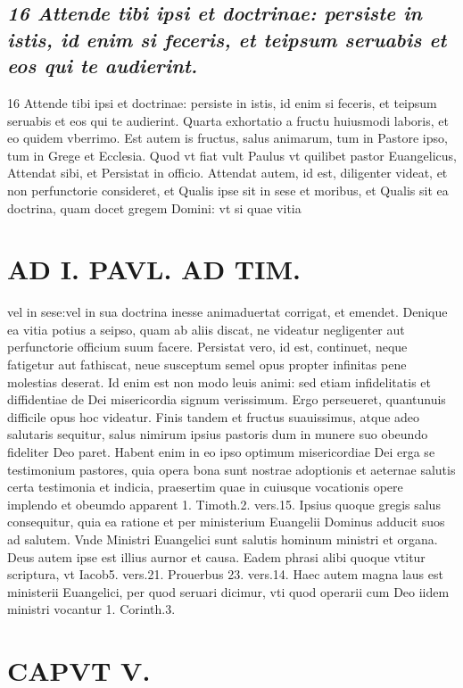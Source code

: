 \documentclass{article}
\begin{document}
\begin{pages}
\subsection*{\textit{16 Attende tibi ipsi et doctrinae: persiste in istis, id enim si feceris, et teipsum seruabis et eos qui te audierint.}}16 Attende tibi ipsi et doctrinae: persiste in istis, id enim si feceris, et teipsum seruabis et eos qui te audierint. Quarta exhortatio a fructu huiusmodi laboris, et eo quidem vberrimo. Est autem is fructus, salus animarum, tum in Pastore ipso, tum in Grege et Ecclesia. Quod vt fiat vult Paulus vt quilibet pastor Euangelicus, Attendat sibi, et Persistat in officio. Attendat autem, id est, diligenter videat, et non perfunctorie consideret, et Qualis ipse sit in sese et moribus, et Qualis sit ea doctrina, quam docet gregem Domini: vt si quae vitia  \pend
\section*{AD I. PAVL. AD TIM. }
\marginpar{[ p.238 ]}\pstart vel in sese:vel in sua doctrina inesse animaduertat corrigat, et emendet. Denique ea vitia potius a seipso, quam ab aliis discat, ne videatur negligenter aut perfunctorie officium suum facere. Persistat vero, id est, continuet, neque fatigetur aut fathiscat, neue susceptum semel opus propter infinitas pene molestias deserat. Id enim est non modo leuis animi: sed etiam infidelitatis et diffidentiae de Dei misericordia signum verissimum. Ergo perseueret, quantunuis difficile opus hoc videatur. Finis tandem et fructus suauissimus, atque adeo salutaris sequitur, salus nimirum ipsius pastoris dum in munere suo obeundo fideliter Deo paret. Habent enim in eo ipso optimum misericordiae Dei erga se testimonium pastores, quia opera bona sunt nostrae adoptionis et aeternae salutis certa testimonia et indicia, praesertim quae in cuiusque vocationis opere implendo et obeumdo apparent 1. Timoth.2. vers.15. Ipsius quoque gregis salus consequitur, quia ea ratione et per ministerium Euangelii Dominus adducit suos ad salutem. Vnde Ministri Euangelici sunt salutis hominum ministri et organa. Deus autem ipse est illius aurnor et causa. Eadem phrasi alibi quoque vtitur scriptura, vt Iacob5. vers.21. Prouerbus 23. vers.14. Haec autem magna laus est ministerii Euangelici, per quod seruari dicimur, vti quod operarii cum Deo iidem ministri vocantur 1. Corinth.3.  \pend
\section{CAPVT  V. }
\marginpar{[ p.239 ]}\pstart {}
{}

\end{pages}
\end{document}

